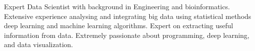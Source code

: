 \small{Expert Data Scientist with background in Engineering  and bioinformatics. Extensive experience analysing and integrating big data using statistical methods deep learning and machine learning algorithms. Expert on extracting useful information from data. Extremely
passionate about programming, deep learning, and data visualization.}



